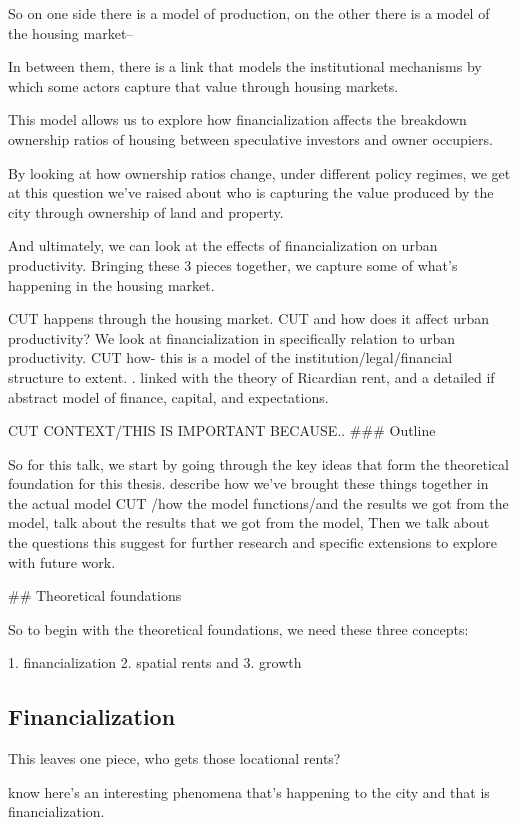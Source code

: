 So on one side there is a model of production, on the other there is a model of the housing market-- 

In between them, there is a link that models the institutional mechanisms by which some actors capture that value through housing markets.


This model allows us to explore  how financialization affects the breakdown ownership ratios of housing between speculative investors and owner occupiers. 

By looking at how ownership ratios change, under different policy regimes, 
we get at this question we've raised about who is capturing the value produced by the city through ownership of land and property. 

And ultimately, we can look at the effects of financialization on urban productivity.  
Bringing these 3 pieces together, we capture  some of what's happening in the housing market.

CUT happens through the housing market.
CUT and how does it affect urban productivity? We look at financialization in specifically relation to urban productivity.
CUT how- this is a model of the institution/legal/financial structure to extent. . linked with the theory of Ricardian rent, and a detailed if abstract model of finance, capital, and expectations. 


CUT CONTEXT/THIS IS IMPORTANT BECAUSE..
### Outline

So for this talk, we  start by going through the key ideas that form the theoretical foundation for this thesis. 
 describe how we've brought these things together in the actual model CUT /how the model functions/and the results we got from the model,
talk about the results that we got from the model,
Then we talk about the questions this suggest for further research and specific extensions to explore with future work. 

## Theoretical foundations

So to begin with the theoretical foundations, we need these three concepts: 

1. financialization
2. spatial rents and
3. growth

\subsection{Financialization}

This leaves one piece, who gets those locational rents?

know here's an interesting phenomena that's happening to the city and that is financialization.

